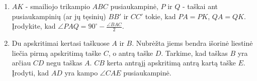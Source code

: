 \begin{enumerate}
\item $AK$ - smailiojo trikampio $ABC$ pusiaukampinė, $P$ ir
  $Q$ - taškai ant pusiaukampinių (ar jų tęsinių) $BB'$ ir
  $CC'$ tokie, kad $PA=PK$, $QA=QK$. Įrodykite, kad $\angle
  PAQ= 90^\circ-\frac{\angle BAC}{2}$. 
\item Du apskritimai kertasi taškuose $A$ ir $B$. Nubrėžta
  jiems bendra išorinė liestinė liečia pirmą apskritimą
  taške $C$, o antrą  taške $D$. Tarkime, kad taškas $B$ yra
  arčiau $CD$ negu taškas $A$. $CB$ kerta antrąjį apskritimą
  antrą kartą taške $E$. Įrodyti, kad $AD$ yra kampo $\angle
  CAE$ pusiaukampinė.  
  

\end{enumerate}
